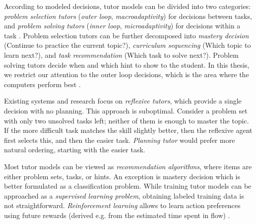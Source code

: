 According to modeled decisions, tutor models can be divided into two categories:
\emph{problem selection tutors} (\emph{outer loop}, \emph{macroadaptivity})
for decisions between tasks, %
and \emph{problem solving tutors} (\emph{inner loop}, \emph{microadaptivity})
for decisions within a task \cite{its-learner-models}. %
Problem selection tutors can be further decomposed %
into
\emph{mastery decision} (Continue to practice the current topic?),
\emph{curriculum sequencing} (Which topic to learn next?),
and \emph{task recommendation} (Which task to solve next?).
Problem solving tutors decide when and which hint to show to the student.
In this thesis, we restrict our attention to the outer loop decisions,
which is the area where the computers perform best \cite{als-future}.

Existing systems and research focus on \emph{reflexive tutors}, which
provide a single decision with no planning. %
This approach is suboptimal. Consider a problem set with only two
unsolved tasks left; neither of them is enough to master the topic.
If the more difficult task matches the skill slightly better, then
the reflexive agent first selects this, and then the easier task.
\emph{Planning tutor} would prefer more natural ordering,
starting with the easier task.

Most tutor models can be viewed as \emph{recommendation algorithms}, %
where items are either problem sets, tasks, or hints.
An exception is mastery decision which is better formulated as a
classification problem.
While training tutor models can be approached as a \emph{supervised learning problem}, %
obtaining labeled training data is not straightforward.
\emph{Reinforcement learning}  \cite{rl}
allows to learn action preferences using future rewards
(derived e.g. from the estimated time spent in flow)
\cite{rl-for-tutors-evaluation}.

